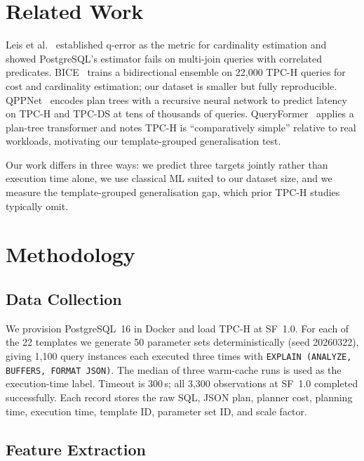 \documentclass[runningheads]{llncs}
\begin{document}
\section{Related Work}
\label{sec:related}

Leis et al.~\cite{leis2015} established q-error as the metric for
cardinality estimation and showed PostgreSQL's estimator fails on
multi-join queries with correlated predicates.
BICE~\cite{liang2023} trains a bidirectional ensemble on 22,000 TPC-H
queries for cost and cardinality estimation; our dataset is smaller but
fully reproducible.
QPPNet~\cite{marcus2019} encodes plan trees with a recursive neural
network to predict latency on TPC-H and TPC-DS at tens of thousands of
queries.
QueryFormer~\cite{zhao2022} applies a plan-tree transformer and notes
TPC-H is ``comparatively simple'' relative to real workloads, motivating
our template-grouped generalisation test.

Our work differs in three ways: we predict three targets jointly rather
than execution time alone, we use classical ML suited to our dataset
size, and we measure the template-grouped generalisation gap, which
prior TPC-H studies typically omit.

\section{Methodology}
\label{sec:method}

\subsection{Data Collection}

We provision PostgreSQL~16 in Docker and load TPC-H at SF~1.0.
For each of the 22 templates we generate 50 parameter sets
deterministically (seed 20260322), giving 1,100 query instances each
executed three times with \texttt{EXPLAIN (ANALYZE, BUFFERS, FORMAT JSON)}.
The median of three warm-cache runs is used as the execution-time label.
Timeout is 300\,s; all 3,300 observations at SF~1.0 completed
successfully.
Each record stores the raw SQL, JSON plan, planner cost, planning time,
execution time, template ID, parameter set ID, and scale factor.

\subsection{Feature Extraction}
\end{document}
